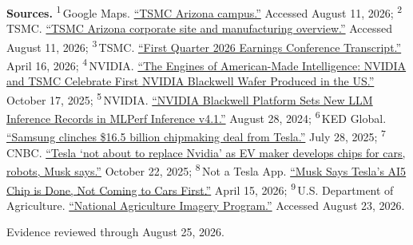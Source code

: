 \begin{minipage}[t][0.90\textheight][t]{\textwidth}
{\sffamily\scriptsize\setlength{\emergencystretch}{1.5em}\textbf{Sources.} \textsuperscript{1}\,Google Maps. \href{\detokenize{https://maps.app.goo.gl/rgCqvY34HuN419jw8}}{\enquote{TSMC Arizona campus.}} Accessed August 11, 2026; \textsuperscript{2}\,TSMC. \href{\detokenize{https://www.tsmc.com/static/abouttsmcaz/index.htm}}{\enquote{TSMC Arizona corporate site and manufacturing overview.}} Accessed August 11, 2026; \textsuperscript{3}\,TSMC. \href{\detokenize{https://investor.tsmc.com/chinese/encrypt/files/encrypt_file/reports/2026-04/3cef85204275f94fd111485cfdf4adb3c0263c45/TSMC}\%\detokenize{201Q26}\%\detokenize{20Transcript.pdf}}{\enquote{First Quarter 2026 Earnings Conference Transcript.}} April 16, 2026; \textsuperscript{4}\,NVIDIA. \href{\detokenize{https://blogs.nvidia.com/blog/tsmc-blackwell-manufacturing/}}{\enquote{The Engines of American-Made Intelligence: NVIDIA and TSMC Celebrate First NVIDIA Blackwell Wafer Produced in the US.}} October 17, 2025; \textsuperscript{5}\,NVIDIA. \href{\detokenize{https://developer.nvidia.com/blog/nvidia-blackwell-platform-sets-new-llm-inference-records-in-mlperf-inference-v4-1/}}{\enquote{NVIDIA Blackwell Platform Sets New LLM Inference Records in MLPerf Inference v4.1.}} August 28, 2024; \textsuperscript{6}\,KED Global. \href{\detokenize{https://www.kedglobal.com/korean-chipmakers/newsView/ked202507280001}}{\enquote{Samsung clinches \$16.5 billion chipmaking deal from Tesla.}} July 28, 2025; \textsuperscript{7}\,CNBC. \href{\detokenize{https://www.cnbc.com/2025/10/22/elon-musk-tesla-ai5-nvidia.html}}{\enquote{Tesla `not about to replace Nvidia' as EV maker develops chips for cars, robots, Musk says.}} October 22, 2025; \textsuperscript{8}\,Not a Tesla App. \href{\detokenize{https://www.notateslaapp.com/news/3974/musk-says-teslas-ai5-chip-is-done-not-coming-to-vehicles-first}}{\enquote{Musk Says Tesla's AI5 Chip is Done, Not Coming to Cars First.}} April 15, 2026; \textsuperscript{9}\,U.S. Department of Agriculture. \href{\detokenize{https://planetarycomputer.microsoft.com/dataset/naip}}{\enquote{National Agriculture Imagery Program.}} Accessed August 23, 2026.\par}
\vfill
\noindent{\color{hairline}\rule{\linewidth}{0.4pt}}\par\smallskip
{\sffamily\scriptsize\color{black!58} Evidence reviewed through August 25, 2026.\par}
\end{minipage}
\clearpage
